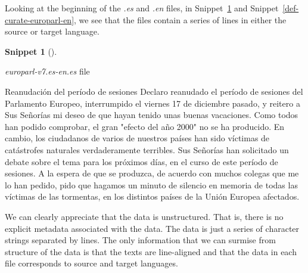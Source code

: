 \documentclass[
  letterpaper,
  krantz1]{latex/krantz-mod}
\newenvironment{Shaded}{\begin{snugshade}}{\end{snugshade}}
\newcommand{\NormalTok}[1]{\textcolor[rgb]{0.00,0.00,0.00}{#1}}
\theoremstyle{definition}
\newtheorem{definition}{Snippet}[chapter]
\theoremstyle{definition}
\theoremstyle{remark}
\begin{document}
Looking at the beginning of the \emph{.es} and \emph{.en} files, in
Snippet~\ref{def-curate-europarl-es} and
Snippet~\ref{def-curate-europarl-en}, we see that the files contain a
series of lines in either the source or target language.

\begin{definition}[]\protect\hypertarget{def-curate-europarl-es}{}\label{def-curate-europarl-es}

\emph{europarl-v7.es-en.es} file

\begin{Shaded}
\begin{Highlighting}[]
\NormalTok{Reanudación del período de sesiones}
\NormalTok{Declaro reanudado el período de sesiones del Parlamento Europeo, interrumpido el viernes 17 de diciembre pasado, y reitero a Sus Señorías mi deseo de que hayan tenido unas buenas vacaciones.}
\NormalTok{Como todos han podido comprobar, el gran "efecto del año 2000" no se ha producido. En cambio, los ciudadanos de varios de nuestros países han sido víctimas de catástrofes naturales verdaderamente terribles.}
\NormalTok{Sus Señorías han solicitado un debate sobre el tema para los próximos días, en el curso de este período de sesiones.}
\NormalTok{A la espera de que se produzca, de acuerdo con muchos colegas que me lo han pedido, pido que hagamos un minuto de silencio en memoria de todas las víctimas de las tormentas, en los distintos países de la Unión Europea afectados.}
\end{Highlighting}
\end{Shaded}

\end{definition}

We can clearly appreciate that the data is unstructured. That is, there
is no explicit metadata associated with the data. The data is just a
series of character strings separated by lines. The only information
that we can surmise from structure of the data is that the texts are
line-aligned and that the data in each file corresponds to source and
target languages.
\end{document}
